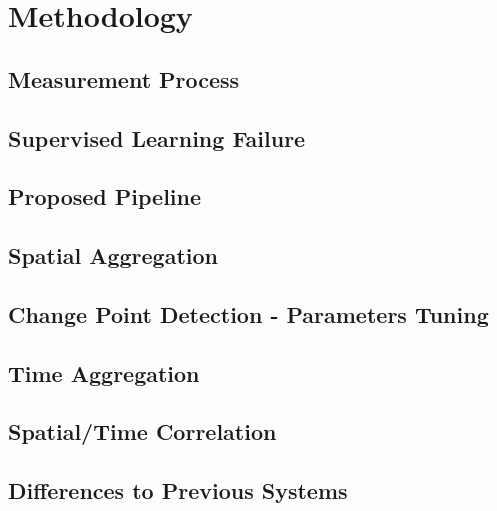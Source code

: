 \chapter{Methodology}

\section{Measurement Process}
\section{Supervised Learning Failure}
\section{Proposed Pipeline}
\section{Spatial Aggregation}
\section{Change Point Detection - Parameters Tuning}
\section{Time Aggregation}
\section{Spatial/Time Correlation}
\section{Differences to Previous Systems}
